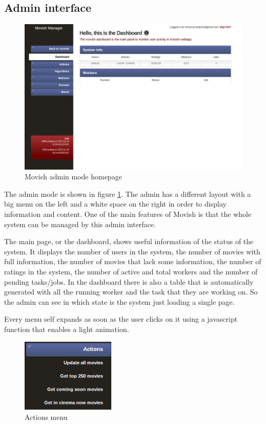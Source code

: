 \subsection{Admin interface}
\label{sec:admin_interface}


\begin{figure}
  \centering
  \includegraphics[width=\textwidth]{figures/admin_page.png}
  \caption{Movish admin mode homepage}
  \label{fig:admin_mode_homepage}
\end{figure}

The admin mode is shown in figure \ref{fig:admin_mode_homepage}. The admin has a different layout with a big menu on the left and a white space on the right in order to display information and content.
One of the main features of Movish is that the whole system can be managed by this admin interface.

The main page, or the dashboard, shows useful information of the status of the system. It displays the number of users in the system, the number of movies with full information, the number of movies that lack some information, the number of ratings in the system, the number of active and total workers and the number of pending tasks/jobs. In the dashboard there is also a table that is automatically generated with all the running worker and the task that they are working on. So the admin can see in which state is the system just loading a single page.

Every menu self expands as soon as the user clicks on it using a javascript function that enables a light animation.

\begin{figure}
  \centering
  \includegraphics[width=0.4\textwidth]{figures/menu_actions.png}
  \caption{Actions menu}
  \label{fig:actions_menu}
\end{figure}

